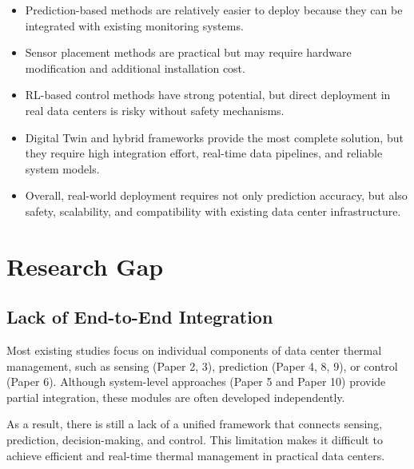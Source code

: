 \documentclass[12pt,a4paper]{article}
\begin{document}
                    \begin{itemize}
                        \item Prediction-based methods are relatively easier to deploy because they can be integrated with existing monitoring systems.
                        
                        \item Sensor placement methods are practical but may require hardware modification and additional installation cost.
                        
                        \item RL-based control methods have strong potential, but direct deployment in real data centers is risky without safety mechanisms.
                        
                        \item Digital Twin and hybrid frameworks provide the most complete solution, but they require high integration effort, real-time data pipelines, and reliable system models.
                        
                        \item Overall, real-world deployment requires not only prediction accuracy, but also safety, scalability, and compatibility with existing data center infrastructure.
                    \end{itemize}
                    
\section{Research Gap}

    \subsection{Lack of End-to-End Integration}
                Most existing studies focus on individual components of data center thermal management, such as sensing (Paper 2, 3), prediction (Paper 4, 8, 9), or control (Paper 6). Although system-level approaches (Paper 5 and Paper 10) provide partial integration, these modules are often developed independently.
        
                As a result, there is still a lack of a unified framework that connects sensing, prediction, decision-making, and control. This limitation makes it difficult to achieve efficient and real-time thermal management in practical data centers.
        
\end{document}
